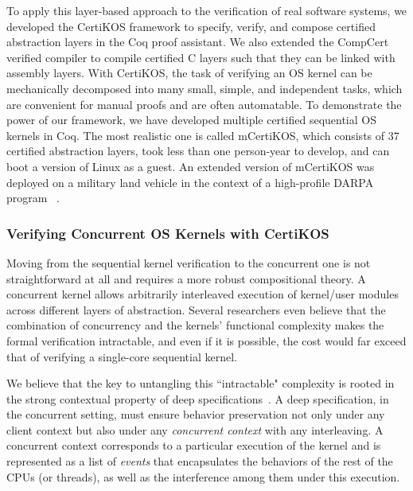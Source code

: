 \documentclass[a4paper, 10pt]{article}
\begin{document}
\begin{small}
To apply this layer-based approach to the verification of real software systems,
we developed the CertiKOS framework to  specify,  verify,  and compose certified abstraction layers  in the Coq proof assistant.
We also extended
the CompCert verified compiler to compile certified C layers such
that they can be linked with assembly layers.
With CertiKOS, the task of verifying an  OS kernel
can be mechanically decomposed into many small, simple, and
independent tasks, which are convenient for manual proofs and are often automatable.
To demonstrate the power of our  framework,
 we have developed multiple certified
sequential OS kernels in Coq. 
The most realistic one is called mCertiKOS,
which consists of 37 certified abstraction layers, 
took less than one person-year to develop,
and can boot a version of Linux as a guest.
An extended version of mCertiKOS was deployed on a military land vehicle in the context of a high-profile  DARPA program
~\cite{hacms}.

\subsubsection*{\small Verifying Concurrent OS Kernels with CertiKOS}
Moving from the sequential kernel verification
to the concurrent one is not straightforward at all
and requires a more robust compositional theory.
A concurrent kernel allows arbitrarily  interleaved
execution of kernel/user modules across different
layers of abstraction. 
Several researchers even believe that the combination of concurrency and the kernels' functional complexity makes the formal verification intractable,
and even if it is possible, the cost would far exceed that of
verifying a single-core sequential kernel.

We believe that the key to untangling this ``intractable" complexity is rooted in the
strong contextual property of deep specifications~\cite{osdi16-gu, pldi18-gu,cacm-gu}.
A deep specification, in the concurrent setting, must ensure    behavior preservation not only under any client context but also under
any \emph{concurrent context} with any interleaving.
A  concurrent context corresponds to
a particular execution of the kernel  and is represented as a list of \emph{events} that encapsulates the behaviors of the rest of the CPUs (or threads), as well as the interference
among them under this  execution.


\end{small}
\end{document}
